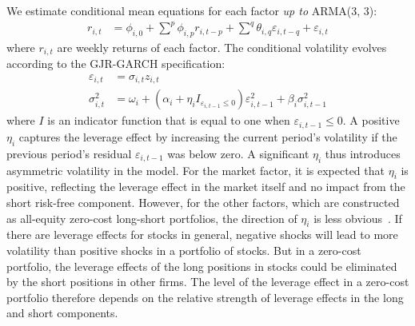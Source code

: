 We estimate conditional mean equations for each factor \emph{up to} ARMA(3, 3):
\begin{align}
  r_{i,t} &=
    \phi_{i,0} +
    \sum^p \phi_{i,p} r_{i,t - p} +
    \sum^q \theta_{i,q} \varepsilon_{i,t - q} + 
    \varepsilon_{i,t}
    \label{eq:garch_mean}
\end{align}
where $r_{i,t}$ are weekly returns of each factor. The conditional volatility evolves according to the GJR-GARCH specification:
\begin{align}
  \varepsilon_{i,t} &= \sigma_{i,t} z_{i,t} \\
  \sigma_{i,t}^2 &=
    \omega_i +
    (\alpha_i + \eta_i I_{\varepsilon_{i,t-1} \leq 0}) \varepsilon_{i,t - 1}^2 +
    \beta_{i} \sigma^2_{i,t - 1}
    \label{eq:garch_garch}
\end{align}
where $I$ is an indicator function that is equal to one when $\varepsilon_{i,t-1} \leq 0$. A positive $\eta_i$ captures the leverage effect by increasing the current period's volatility if the previous period's residual $\varepsilon_{i,t-1}$ was below zero. A significant $\eta_i$ thus introduces asymmetric volatility in the model. For the market factor, it is expected that $\eta_i$ is positive, reflecting the leverage effect in the market itself and no impact from the short risk-free component. However, for the other factors, which are constructed as all-equity zero-cost long-short portfolios, the direction of $\eta_i$ is less obvious~\autocite{ChristoffersenLanglois2013}. If there are leverage effects for stocks in general, negative shocks will lead to more volatility than positive shocks in a portfolio of stocks. But in a zero-cost portfolio, the leverage effects of the long positions in stocks could be eliminated by the short positions in other firms. The level of the leverage effect in a zero-cost portfolio therefore depends on the relative strength of leverage effects in the long and short components.

